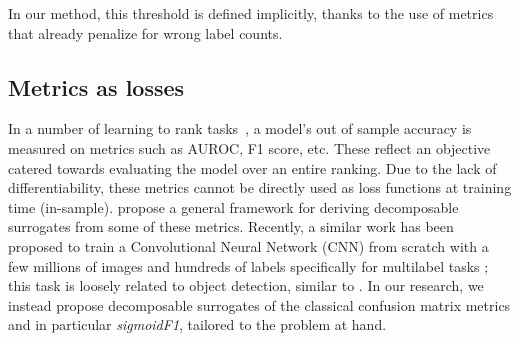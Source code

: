 In our method, this threshold is defined implicitly, thanks to the use of metrics that already penalize for
wrong label counts.


\subsection{Metrics as losses}

In a number of learning to rank tasks~\cite{LTR}, a model's out of sample accuracy is measured on metrics such as AUROC, F1 score, etc. These reflect an objective catered towards evaluating the model over an entire ranking. Due to the lack of differentiability, these metrics cannot be directly used as loss
functions at training time (in-sample). \citet{optimizableLosses} propose a general framework for deriving
decomposable surrogates from some of these metrics.
Recently, a similar work has been proposed to train a Convolutional
Neural Network (CNN) from scratch with a few millions of images and hundreds
of labels specifically for multilabel tasks \cite{tencent}; this task is loosely related to object detection, similar to \cite{multitaskLabelImages}.
In our research, we instead propose decomposable surrogates of the classical confusion matrix metrics and in particular \emph{sigmoidF1}, tailored to the problem at hand.





